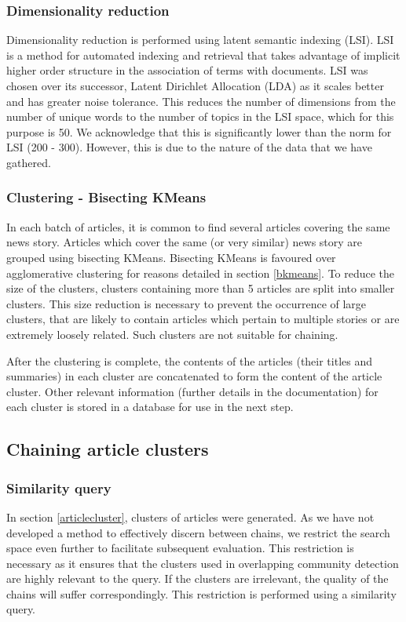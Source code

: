 \documentclass[12pt]{article}
\begin{document}
\subsubsection{Dimensionality reduction} \label{dimreduction}
Dimensionality reduction is performed using latent semantic indexing (LSI). LSI is a method for automated indexing and retrieval that takes advantage of implicit higher order structure in the association of terms with documents. LSI was chosen over its successor, Latent Dirichlet Allocation (LDA) as it scales better and has greater noise tolerance. This reduces the number of dimensions from the number of unique words to the number of topics in the LSI space, which for this purpose is 50. We acknowledge that this is significantly lower than the norm for LSI (200 - 300). However, this is due to the nature of the data that we have gathered.

\subsubsection{Clustering - Bisecting KMeans} \label{cluster_bkmean}
In each batch of articles, it is common to find several articles covering the same news story. Articles which cover the same (or very similar) news story are grouped using bisecting KMeans. Bisecting KMeans is favoured over agglomerative clustering for reasons detailed in section \ref{bkmeans}. To reduce the size of the clusters, clusters containing more than 5 articles are split into smaller clusters. This size reduction is necessary to prevent the occurrence of large clusters, that are likely to contain articles which pertain to multiple stories or are extremely loosely related. Such clusters are not suitable for chaining.

After the clustering is complete, the contents of the articles (their titles and summaries) in each cluster are concatenated to form the content of the article cluster. Other relevant information (further details in the documentation) for each cluster is stored in a database for use in the next step.

\subsection{Chaining article clusters} \label{chainclusters}
\subsubsection{Similarity query}
In section \ref{articlecluster}, clusters of articles were generated. As we have not developed a method to effectively discern between chains, we restrict the search space even further to facilitate subsequent evaluation. This restriction is necessary as it ensures that the clusters used in overlapping community detection are highly relevant to the query. If the clusters are irrelevant, the quality of the chains will suffer correspondingly. This restriction is performed using a similarity query. 
\end{document}
